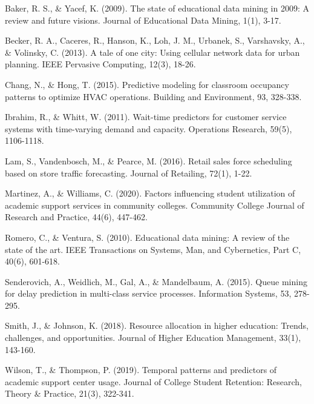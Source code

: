 \documentclass[12pt,letterpaper]{article}
\begin{document}
\begin{thebibliography}{99}

 Baker, R. S., \& Yacef, K. (2009). The state of educational data mining in 2009: A review and future visions. Journal of Educational Data Mining, 1(1), 3-17.

 Becker, R. A., Caceres, R., Hanson, K., Loh, J. M., Urbanek, S., Varshavsky, A., \& Volinsky, C. (2013). A tale of one city: Using cellular network data for urban planning. IEEE Pervasive Computing, 12(3), 18-26.

 Chang, N., \& Hong, T. (2015). Predictive modeling for classroom occupancy patterns to optimize HVAC operations. Building and Environment, 93, 328-338.

 Ibrahim, R., \& Whitt, W. (2011). Wait-time predictors for customer service systems with time-varying demand and capacity. Operations Research, 59(5), 1106-1118.

 Lam, S., Vandenbosch, M., \& Pearce, M. (2016). Retail sales force scheduling based on store traffic forecasting. Journal of Retailing, 72(1), 1-22.

 Martinez, A., \& Williams, C. (2020). Factors influencing student utilization of academic support services in community colleges. Community College Journal of Research and Practice, 44(6), 447-462.

 Romero, C., \& Ventura, S. (2010). Educational data mining: A review of the state of the art. IEEE Transactions on Systems, Man, and Cybernetics, Part C, 40(6), 601-618.

 Senderovich, A., Weidlich, M., Gal, A., \& Mandelbaum, A. (2015). Queue mining for delay prediction in multi-class service processes. Information Systems, 53, 278-295.

 Smith, J., \& Johnson, K. (2018). Resource allocation in higher education: Trends, challenges, and opportunities. Journal of Higher Education Management, 33(1), 143-160.

 Wilson, T., \& Thompson, P. (2019). Temporal patterns and predictors of academic support center usage. Journal of College Student Retention: Research, Theory \& Practice, 21(3), 322-341.

\end{thebibliography}
\end{document}
